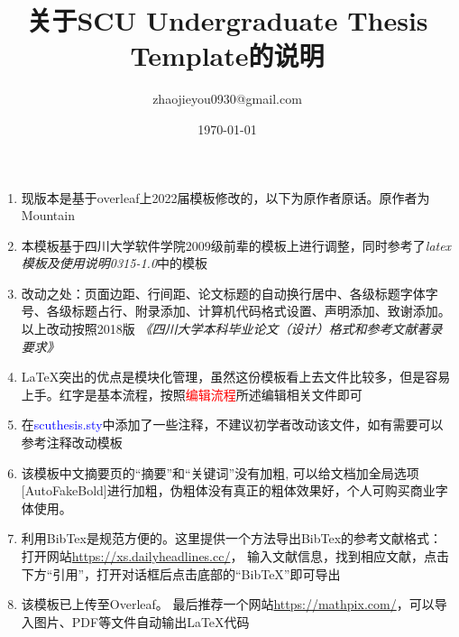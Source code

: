 \documentclass{article}
\title{\heiti 关于SCU Undergraduate Thesis Template的说明}
\author{zhaojieyou0930@gmail.com}
\date{\today}
\begin{document}
 
	\maketitle  
	
	\begin{enumerate}
            \item 现版本是基于overleaf上2022届模板修改的，以下为原作者原话。原作者为 Mountain
		\item 
		本模板基于四川大学软件学院2009级前辈的模板上进行调整，同时参考了\textit{latex模板及使用说明0315-1.0}中的模板
		\item
		改动之处：页面边距、行间距、论文标题的自动换行居中、各级标题字体字号、各级标题占行、附录添加、计算机代码格式设置、声明添加、致谢添加。以上改动按照2018版
		\textit{《四川大学本科毕业论文（设计）格式和参考文献著录要求》}
		\item 
		\LaTeX 突出的优点是模块化管理，虽然这份模板看上去文件比较多，但是容易上手。红字是基本流程，按照\textcolor{red}{编辑流程}所述编辑相关文件即可
		\item
		在\textcolor{blue}{scuthesis.sty}中添加了一些注释，不建议初学者改动该文件，如有需要可以参考注释改动模板
		\item 
		该模板中文摘要页的“摘要”和“关键词”没有加粗,
		可以给文档加全局选项[AutoFakeBold]进行加粗，伪粗体没有真正的粗体效果好，个人可购买商业字体使用。
		\item
		利用BibTex是规范方便的。这里提供一个方法导出BibTex的参考文献格式：打开网站\textcolor{green}{\url{https://xs.dailyheadlines.cc/}}，
		输入文献信息，找到相应文献，点击下方“引用”，打开对话框后点击底部的“BibTeX”即可导出
		\item
		该模板已上传至Overleaf。
		最后推荐一个网站\textcolor{green}{\url{https://mathpix.com/}}，可以导入图片、PDF等文件自动输出\LaTeX 代码
		
	\end{enumerate}
\end{document}
